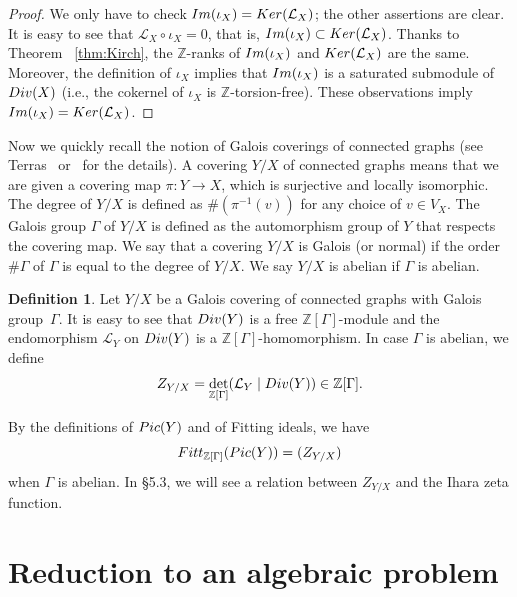 \documentclass[11pt]{article}
\theoremstyle{definition}
\newtheorem{defi}[theo]{Definition}
\numberwithin{equation}{section}
\newcommand{\Z}{\mathbb{Z}}
\newcommand{\cL}{\mathcal{L}}
\newcommand{\Ker}{{\rm Ker}}
\newcommand{\Div}{{\rm Div}}
\newcommand{\Pic}{{\rm Pic}}
\newcommand{\Image}{{\rm Im}}
\newcommand{\Fitt}{{\rm Fitt}}
\begin{document}
\begin{proof}
We only have to check $\Image(\iota_X) = \Ker(\cL_X)$; the other assertions are clear.
It is easy to see that $\cL_X \circ \iota_X = 0$, that is, $\Image(\iota_X) \subset \Ker(\cL_X)$.
Thanks to Theorem ~\ref{thm:Kirch}, the $\Z$-ranks of $\Image(\iota_X)$ and $ \Ker(\cL_X)$ are the same.
Moreover, the definition of $\iota_X$ implies that $\Image(\iota_X)$ is a saturated submodule of $\Div(X)$ (i.e., the cokernel of $\iota_X$ is $\Z$-torsion-free).
These observations imply $\Image(\iota_X) = \Ker(\cL_X)$.
\end{proof}


Now we quickly recall the notion of Galois coverings of connected graphs (see Terras~\cite[Chapter 13]{Ter11} or~\cite[\S 2.1]{RV22} for the details).
A covering $Y/X$ of connected graphs means that we are given a covering map $\pi: Y \to X$, which is surjective and locally isomorphic.
The degree of $Y/X$ is defined as $\# (\pi^{-1}(v))$ for any choice of $v \in V_X$.
The Galois group $\Gamma$ of $Y/X$ is defined as the automorphism group of $Y$ that respects the covering map.
We say that a covering $Y/X$ is Galois (or normal) if the order $\# \Gamma$ of $\Gamma$ is equal to the degree of $Y/X$.
We say $Y/X$ is abelian if $\Gamma$ is abelian.


\begin{defi}\label{defn:Z2}
Let $Y/X$ be a Galois covering of connected graphs with Galois group~$\Gamma$.
It is easy to see that $\Div(Y)$ is a free $\Z[\Gamma]$-module and the endomorphism $\cL_Y$ on $\Div(Y)$ is a $\Z[\Gamma]$-homomorphism.
In case $\Gamma$ is abelian, we define
\begin{equation}\label{eq:Z_YX}
Z_{Y/X} = \det_{\Z[\Gamma]}(\cL_Y \mid \Div(Y)) \in \Z[\Gamma].
\end{equation}
\end{defi}

By the definitions of $\Pic(Y)$ and of Fitting ideals, we have
\begin{equation}\label{eq:Z_YX2}
\Fitt_{\Z[\Gamma]}(\Pic(Y)) = (Z_{Y/X})
\end{equation}
when $\Gamma$ is abelian.
In \S5.3, we will see a relation between $Z_{Y/X}$ and the Ihara zeta function.

\section{Reduction to an algebraic problem}\label{sec:Fin_arith}
\end{document}
